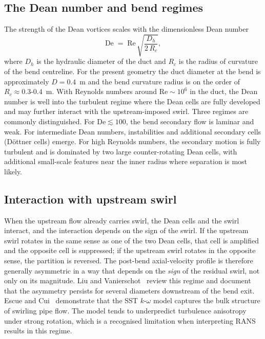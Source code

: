 \subsection{The Dean number and bend regimes}
\label{sec:theory_dean_number}
 
The strength of the Dean vortices scales with the dimensionless Dean number
\begin{equation}
\mathrm{De} \;=\; \mathrm{Re}\,\sqrt{\frac{D_h}{2\,R_c}},
\label{eq:dean}
\end{equation}
where $D_h$ is the hydraulic diameter of the duct and $R_c$ is the radius of curvature of the bend centreline. For the present geometry the duct diameter at the bend is approximately $D = 0.4$~m and the bend curvature radius is on the order of $R_c \approx 0.3$-$0.4$~m. With Reynolds numbers around $\mathrm{Re} \sim 10^6$ in the duct, the Dean number is well into the turbulent regime where the Dean cells are fully developed and may further interact with the upstream-imposed swirl. Three regimes are commonly distinguished. For $\mathrm{De} \lesssim 100$, the bend secondary flow is laminar and weak. For intermediate Dean numbers, instabilities and additional secondary cells (D\"ottner cells) emerge. For high Reynolds numbers, the secondary motion is fully turbulent and is dominated by two large counter-rotating Dean cells, with additional small-scale features near the inner radius where separation is most likely.
 
\subsection{Interaction with upstream swirl}
\label{sec:theory_swirl_bend_interaction}
 
When the upstream flow already carries swirl, the Dean cells and the swirl interact, and the interaction depends on the sign of the swirl. If the upstream swirl rotates in the same sense as one of the two Dean cells, that cell is amplified and the opposite cell is suppressed; if the upstream swirl rotates in the opposite sense, the partition is reversed. The post-bend axial-velocity profile is therefore generally asymmetric in a way that depends on the \emph{sign} of the residual swirl, not only on its magnitude. Liu and Vanierschot~\cite{LiuVanierschot2021} review this regime and document that the asymmetry persists for several diameters downstream of the bend exit. Escue and Cui~\cite{EscueCui2010} demonstrate that the SST $k$-$\omega$ model captures the bulk structure of swirling pipe flow. The model tends to underpredict turbulence anisotropy under strong rotation, which is a recognised limitation when interpreting RANS results in this regime.
 
